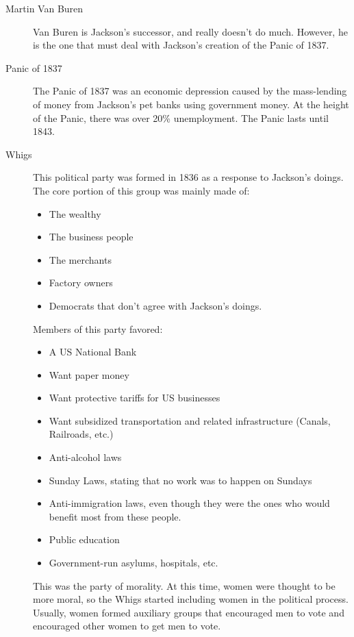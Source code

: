 \begin{description}
\item[Martin Van Buren] Van Buren is Jackson's successor, and really doesn't do much.
  However, he is the one that must deal with Jackson's creation of the Panic of 1837.

\item[Panic of 1837] The Panic of 1837 was an economic depression caused by the mass-lending of money from Jackson's pet banks using government money.
  At the height of the Panic, there was over 20\% unemployment.
  The Panic lasts until 1843.

\item[Whigs] This political party was formed in 1836 as a response to Jackson's doings.
  The core portion of this group was mainly made of:
  \begin{itemize}[noitemsep]
  \item The wealthy
  \item The business people
  \item The merchants
  \item Factory owners
  \item Democrats that don't agree with Jackson's doings.
  \end{itemize}

  Members of this party favored:
  \begin{itemize}[noitemsep]
  \item A US National Bank
  \item Want paper money
  \item Want protective tariffs for US businesses
  \item Want subsidized transportation and related infrastructure (Canals, Railroads, etc.)
  \item Anti-alcohol laws
  \item Sunday Laws, stating that no work was to happen on Sundays
  \item Anti-immigration laws, even though they were the ones who would benefit most from these people.
  \item Public education
  \item Government-run asylums, hospitals, etc.
  \end{itemize}

  This was the party of morality.
  At this time, women were thought to be more moral, so the Whigs started including women in the political process.
  Usually, women formed auxiliary groups that encouraged men to vote and encouraged other women to get men to vote.


\end{description}
